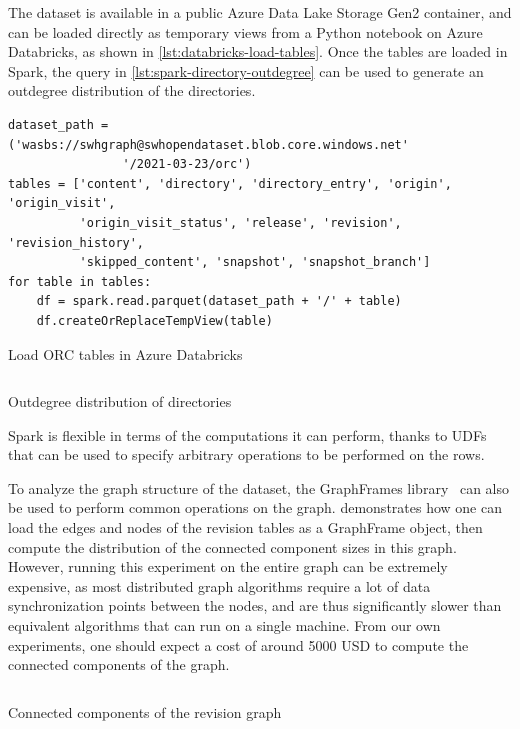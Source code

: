 The dataset is available in a public Azure Data Lake Storage Gen2 container,
and can be loaded directly as temporary views from a Python notebook on Azure
Databricks, as shown in \cref{lst:databricks-load-tables}.
Once the tables are loaded in Spark, the query in
\cref{lst:spark-directory-outdegree} can be used to generate an
outdegree distribution of the directories.

\begin{listing}
\begin{verbatim}
dataset_path = ('wasbs://swhgraph@swhopendataset.blob.core.windows.net'
                '/2021-03-23/orc')
tables = ['content', 'directory', 'directory_entry', 'origin', 'origin_visit',
          'origin_visit_status', 'release', 'revision', 'revision_history',
          'skipped_content', 'snapshot', 'snapshot_branch']
for table in tables:
    df = spark.read.parquet(dataset_path + '/' + table)
    df.createOrReplaceTempView(table)
\end{verbatim}
\caption{Load ORC tables in Azure Databricks}%
\label{lst:databricks-load-tables}
\end{listing}

\begin{listing}
    \inputminted{sql}{codesamples/graph-dataset/spark-degree.sql}
    \caption{Outdegree distribution of directories}%
    \label{lst:spark-directory-outdegree}
\end{listing}

Spark is flexible in terms of the computations it can perform, thanks to
\glspl{UDF}~\cite{armbrust2015spark} that can be used to specify
arbitrary operations to be performed on the rows.

To analyze the graph structure of the dataset, the GraphFrames
library~\cite{dave2016graphframes} can also be used to perform common
operations on the graph.  demonstrates how one can load the
edges and nodes of the revision tables as a GraphFrame object, then compute the
distribution of the connected component sizes in this graph. However, running
this experiment on the entire graph can be extremely expensive, as most
distributed graph algorithms require a lot of data synchronization points
between the nodes, and are thus significantly slower than equivalent algorithms
that can run on a single machine. From our own experiments, one should expect a
cost of around \num{5000} USD to compute the connected components of the graph.

\begin{listing}
    \inputminted{python}{codesamples/graph-dataset/spark-cc.py}
    \caption{Connected components of the revision graph}%
    \label{lst:cc}
\end{listing}
